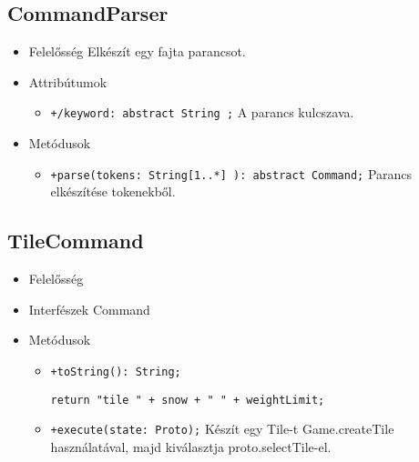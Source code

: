 \subsection{CommandParser}
\begin{itemize}
\item Felelősség\newline
Elkészít egy fajta parancsot.
\item Attribútumok
	\begin{itemize}
		\item \texttt{+/keyword: abstract String ;} \newline
		A parancs kulcszava.
	\end{itemize}
\item Metódusok
\begin{itemize}
		\item \texttt{+parse(tokens: String[1..*] ): abstract Command;} \newline
		 Parancs elkészítése tokenekből.
	\end{itemize}
\end{itemize}

\subsection{TileCommand}
\begin{itemize}
\item Felelősség\newline
\item Interfészek\newline
Command
\item Metódusok
\begin{itemize}
		\item \texttt{+toString(): String;}
		\begin{lstlisting}
return "tile " + snow + " " + weightLimit;
		\end{lstlisting}
		\item \texttt{+execute(state: Proto);} \newline
		Készít egy Tile-t Game.createTile használatával, majd kiválasztja proto.selectTile-el.
	\end{itemize}
\end{itemize}
